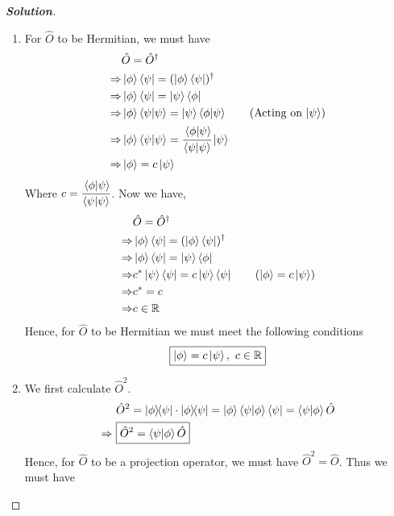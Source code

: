 \documentclass[10pt]{scrartcl}
\theoremstyle{definition}
\newenvironment{solution} {\begin{proof}[\normalfont \textbf{Solution}]} {\end{proof}}
\newcommand{\rn}{\mathbb{R}}
\newcommand*{\OO}{\hat{O}}
\begin{document}
\begin{solution}
    $ $
    \begin{enumerate}[label={(\alph*)}]
        \item For $\hat{O}$ to be Hermitian, we must have 
            \begin{align*}
                &\hat{O} = \hat{O}^\dagger \\ 
                \Rightarrow &\ket{\phi} \bra{\psi} = (\ket{\phi} \bra{\psi})^\dagger \\
                \Rightarrow &\ket{\phi} \bra{\psi} = \ket{\psi} \bra{\phi} \\
                \Rightarrow &\ket{\phi} \bra{\psi} \ket{\psi} = \ket{\psi} \bra{\phi} \ket{\psi} \tag{Acting on $\ket{\psi}$}\\
                \Rightarrow &\ket{\phi} \bra{\psi} \ket{\psi} = \cfrac{\ip{\phi}{\psi}}{\ip{\psi}{\psi}} \ket{\psi}\\
                \Rightarrow &\ket{\phi} = c\ket{\psi} \\
            \end{align*}
            Where $c = \cfrac{\ip{\phi}{\psi}}{\ip{\psi}{\psi}}$. Now we have, 
            \begin{align*}
                &\hat{O} = \hat{O}^\dagger \\ 
                \Rightarrow &\ket{\phi} \bra{\psi} = (\ket{\phi} \bra{\psi})^\dagger \\
                \Rightarrow &\ket{\phi} \bra{\psi} = \ket{\psi} \bra{\phi} \\
                \Rightarrow &c^*\ket{\psi} \bra{\psi} = c\ket{\psi} \bra{\psi} \tag{$\ket{\phi} = c\ket{\psi}$}\\
                \Rightarrow &c^* = c \\ 
                \Rightarrow &c \in \rn
            \end{align*}
            Hence, for $\OO$ to be Hermitian we must meet the following conditions $$\boxed{\ket{\phi} = c\ket{\psi}, ~ c \in \rn}$$
        \item We first calculate $\OO^2$. 
            \begin{align*}
                &\OO^2 = \op{\phi}{\psi} \cdot \op{\phi}{\psi} = \ket{\phi} \ip{\psi}{\phi} \bra{\psi} = \ip{\psi}{\phi} \OO \\ 
                \Rightarrow ~ &\boxed{\OO^2 = \ip{\psi}{\phi} \OO}
            \end{align*}
            Hence, for $\OO$ to be a projection operator, we must have $\OO^2 = \OO$. Thus we must have 

\end{enumerate}
\end{solution}
\end{document}
